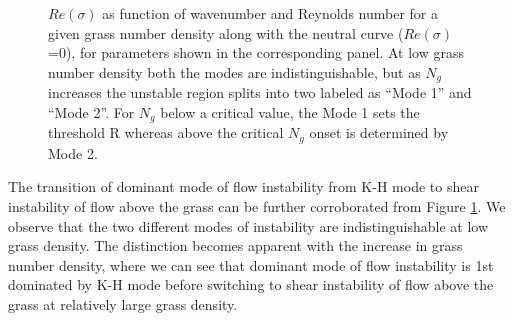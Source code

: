\documentclass[aps,prl,twocolumn,showpacs,superscriptaddress,groupedaddress,10pt]{revtex4-1}  %
\newcommand{\Rey}{\text{R}}
\begin{document}
\begin{figure}
\caption{$Re(\sigma)$ as function of wavenumber and Reynolds number for a given grass number density along with the neutral curve ($Re(\sigma)$=0), for parameters shown in the corresponding panel.  
At low grass number density both the modes are indistinguishable, but as $N_g$ increases the unstable region splits into two labeled as ``Mode 1'' and ``Mode 2''. For $N_g$ below
a critical value, the Mode 1 sets the threshold $\Rey$ whereas above the critical $N_{g}$ onset is determined by Mode 2.}
\label{K_Re_sigma_set3}
\end{figure}

The transition of dominant mode of flow instability from K-H mode to shear instability of flow above the grass can be further corroborated from Figure \ref{K_Re_sigma_set3}.
We observe that the two different modes of instability are indistinguishable at low grass density. The distinction becomes apparent with the increase in grass number density, where we 
can see that dominant mode of flow instability is 1st dominated by K-H mode before switching to shear instability of flow above the grass at relatively large grass density.  
\end{document}
